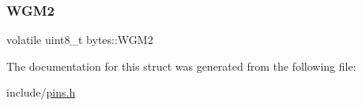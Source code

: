 \mbox{\label{structbytes_a89629be7fefa4977a3caa8f221b91054}} 
\subsubsection{\texorpdfstring{W\+G\+M2}{WGM2}}
{\footnotesize\ttfamily volatile uint8\+\_\+t bytes\+::\+W\+G\+M2}



The documentation for this struct was generated from the following file\+:\begin{DoxyCompactItemize}
\item 
include/\mbox{\hyperlink{pins_8h}{pins.\+h}}\end{DoxyCompactItemize}
